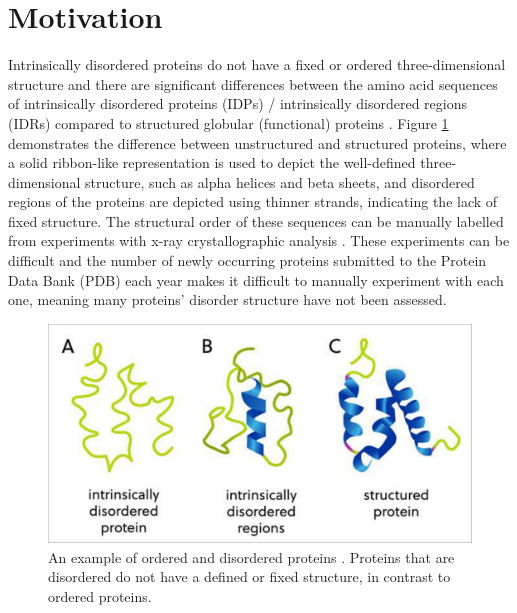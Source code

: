 \documentclass{l4proj}
\begin{document}

\section{Motivation}

Intrinsically disordered proteins do not have a fixed or ordered three-dimensional structure and there are significant differences between the amino acid sequences of intrinsically disordered proteins (IDPs) / intrinsically disordered regions (IDRs) compared to structured globular (functional) proteins \citep{Martinelli:19}. Figure \ref{fig:structured prot} demonstrates the difference between unstructured and structured proteins, where a solid ribbon-like representation is used to depict the well-defined three-dimensional structure, such as alpha helices and beta sheets, and disordered regions of the proteins are depicted using thinner strands, indicating the lack of fixed structure. The structural order of these sequences can be manually labelled from experiments with x-ray crystallographic analysis \citep{idp:wiki}. These experiments can be difficult and the number of newly occurring proteins submitted to the Protein Data Bank (PDB) \citep{pdb} each year makes it difficult to manually experiment with each one, meaning many proteins’ disorder structure have not been assessed.

\begin{figure}[!htb]
    \centering
    \includegraphics[width=\linewidth]{images/structprot.pdf}

    \caption{An example of ordered and disordered proteins \citep{Tenchov:22}. Proteins that are disordered do not have a defined or fixed structure, in contrast to ordered proteins.}
    \label{fig:structured prot} 
\end{figure}
\end{document}
